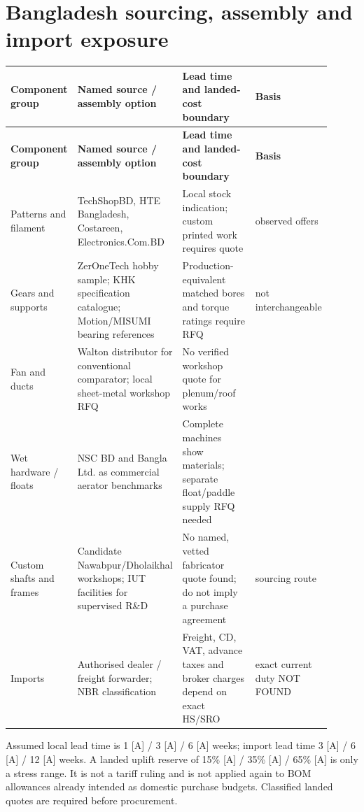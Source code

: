 \documentclass[11pt,a4paper]{article}
\begin{document}
\clearpage\section{Bangladesh sourcing, assembly and import exposure}
{\small
\setlength{\tabcolsep}{3pt}\renewcommand{\arraystretch}{1.18}
\begin{longtable}{@{}>{\raggedright\arraybackslash}p{0.1756\linewidth}>{\raggedright\arraybackslash}p{0.2874\linewidth}>{\raggedright\arraybackslash}p{0.3193\linewidth}>{\raggedright\arraybackslash}p{0.1277\linewidth}@{}}
\toprule \textbf{Component group} & \textbf{Named source / assembly option} & \textbf{Lead time and landed-cost boundary} & \textbf{Basis} \\ \midrule
\endfirsthead\toprule \textbf{Component group} & \textbf{Named source / assembly option} & \textbf{Lead time and landed-cost boundary} & \textbf{Basis} \\ \midrule
\endhead\bottomrule\endfoot
Patterns and filament & TechShopBD, HTE Bangladesh, Costareen, Electronics.Com.BD & Local stock indication; custom printed work requires quote & [S] observed offers \cite{filament1,filament2,filament3,filament4} \\
Gears and supports & ZerOneTech hobby sample; KHK specification catalogue; Motion/MISUMI bearing references & Production-equivalent matched bores and torque ratings require RFQ & [S/A] not interchangeable \cite{gear,khk,bearing1,bearing2,bearing3} \\
Fan and ducts & Walton distributor for conventional comparator; local sheet-metal workshop RFQ & No verified workshop quote for plenum/roof works & [S/A] \cite{fanweb} \\
Wet hardware / floats & NSC BD and Bangla Ltd. as commercial aerator benchmarks & Complete machines show materials; separate float/paddle supply RFQ needed & [S/A] \cite{aerator1,banglaaer} \\
Custom shafts and frames & Candidate Nawabpur/Dholaikhal workshops; IUT facilities for supervised R\&D & No named, vetted fabricator quote found; do not imply a purchase agreement & [A] sourcing route \\
Imports & Authorised dealer / freight forwarder; NBR classification & Freight, CD, VAT, advance taxes and broker charges depend on exact HS/SRO & [A] exact current duty NOT FOUND \cite{customs} \\
\end{longtable}}
Assumed local lead time is \num{1} [A] / \num{3} [A] / \num{6} [A] weeks; import lead time \num{3} [A] / \num{6} [A] / \num{12} [A] weeks. A landed uplift reserve of \num{15}\% [A] / \num{35}\% [A] / \num{65}\% [A] is only a stress range. It is not a tariff ruling and is not applied again to BOM allowances already intended as domestic purchase budgets. Classified landed quotes are required before procurement.
\end{document}
